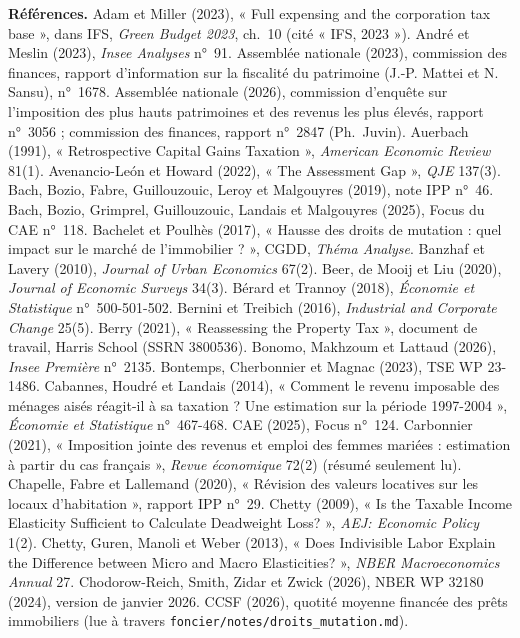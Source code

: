 \vspace{8pt}
{\scriptsize\setlength{\parskip}{2pt}\textbf{Références.}
Adam et Miller (2023), « Full expensing and the corporation tax base », dans IFS, \emph{Green Budget 2023}, ch.~10 (cité
« IFS, 2023 »).
André et Meslin (2023), \emph{Insee Analyses} n°~91.
Assemblée nationale (2023), commission des finances, rapport d'information sur la fiscalité du patrimoine (J.-P. Mattei et
N. Sansu), n°~1678.
Assemblée nationale (2026), commission d'enquête sur l'imposition des plus hauts patrimoines et des revenus les
plus élevés, rapport n°~3056 ; commission des finances, rapport n°~2847 (Ph.~Juvin).
Auerbach (1991), « Retrospective Capital Gains Taxation », \emph{American Economic Review} 81(1).
Avenancio-León et Howard (2022), « The Assessment Gap », \emph{QJE} 137(3).
Bach, Bozio, Fabre, Guillouzouic, Leroy et Malgouyres (2019), note IPP n°~46.
Bach, Bozio, Grimprel, Guillouzouic, Landais et Malgouyres (2025), Focus du CAE n°~118.
Bachelet et Poulhès (2017), « Hausse des droits de mutation : quel impact sur le marché de l'immobilier ? »,
CGDD, \emph{Théma Analyse}.
Banzhaf et Lavery (2010), \emph{Journal of Urban Economics} 67(2).
Beer, de Mooij et Liu (2020), \emph{Journal of Economic Surveys} 34(3).
Bérard et Trannoy (2018), \emph{Économie et Statistique} n°~500-501-502.
Bernini et Treibich (2016), \emph{Industrial and Corporate Change} 25(5).
Berry (2021), « Reassessing the Property Tax », document de travail, Harris School (SSRN 3800536).
Bonomo, Makhzoum et Lattaud (2026), \emph{Insee Première} n°~2135.
Bontemps, Cherbonnier et Magnac (2023), TSE WP 23-1486.
Cabannes, Houdré et Landais (2014), « Comment le revenu imposable des ménages aisés réagit-il à sa taxation ? Une
estimation sur la période 1997-2004 », \emph{Économie et Statistique} n°~467-468.
CAE (2025), Focus n°~124.
Carbonnier (2021), « Imposition jointe des revenus et emploi des femmes mariées : estimation à partir du cas
français », \emph{Revue économique} 72(2) (résumé seulement lu).
Chapelle, Fabre et Lallemand (2020), « Révision des valeurs locatives sur les locaux d'habitation », rapport IPP n°~29.
Chetty (2009), « Is the Taxable Income Elasticity Sufficient to Calculate Deadweight Loss? », \emph{AEJ:
Economic Policy} 1(2).
Chetty, Guren, Manoli et Weber (2013), « Does Indivisible Labor Explain the Difference between Micro and Macro
Elasticities? », \emph{NBER Macroeconomics Annual} 27.
Chodorow-Reich, Smith, Zidar et Zwick (2026), NBER WP 32180 (2024), version de janvier 2026.
CCSF (2026), quotité moyenne financée des prêts immobiliers (lue à travers \texttt{foncier/notes/droits\_mutation.md}).
}
